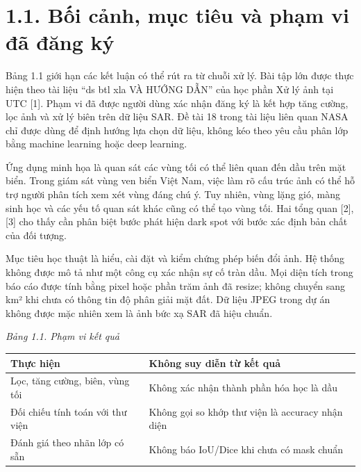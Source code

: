 \documentclass[13pt,a4paper]{extreport}
\begin{document}
\section*{1.1. Bối cảnh, mục tiêu và phạm vi đã đăng ký}
Bảng 1.1 giới hạn các kết luận có thể rút ra từ chuỗi xử lý. Bài tập lớn được thực hiện theo tài liệu “ds btl xla VÀ HƯỚNG DẪN” của học phần Xử lý ảnh tại UTC [1]. Phạm vi đã được người dùng xác nhận đăng ký là kết hợp tăng cường, lọc ảnh và xử lý biên trên dữ liệu SAR. Đề tài 18 trong tài liệu liên quan NASA chỉ được dùng để định hướng lựa chọn dữ liệu, không kéo theo yêu cầu phân lớp bằng machine learning hoặc deep learning.
\par
Ứng dụng minh họa là quan sát các vùng tối có thể liên quan đến dầu trên mặt biển. Trong giám sát vùng ven biển Việt Nam, việc làm rõ cấu trúc ảnh có thể hỗ trợ người phân tích xem xét vùng đáng chú ý. Tuy nhiên, vùng lặng gió, màng sinh học và các yếu tố quan sát khác cũng có thể tạo vùng tối. Hai tổng quan [2], [3] cho thấy cần phân biệt bước phát hiện dark spot với bước xác định bản chất của đối tượng.
\par
Mục tiêu học thuật là hiểu, cài đặt và kiểm chứng phép biến đổi ảnh. Hệ thống không được mô tả như một công cụ xác nhận sự cố tràn dầu. Mọi diện tích trong báo cáo được tính bằng pixel hoặc phần trăm ảnh đã resize; không chuyển sang km² khi chưa có thông tin độ phân giải mặt đất. Dữ liệu JPEG trong dự án không được mặc nhiên xem là ảnh bức xạ SAR đã hiệu chuẩn.
\par
\noindent\textit{Bảng 1.1. Phạm vi kết quả}
\begin{longtable}{p{7.3cm}|p{7.3cm}}
Thực hiện & Không suy diễn từ kết quả\\\hline
Lọc, tăng cường, biên, vùng tối & Không xác nhận thành phần hóa học là dầu\\\hline
Đối chiếu tính toán với thư viện & Không gọi so khớp thư viện là accuracy nhận diện\\\hline
Đánh giá theo nhãn lớp có sẵn & Không báo IoU/Dice khi chưa có mask chuẩn\\\hline
\end{longtable}
\clearpage
\end{document}
